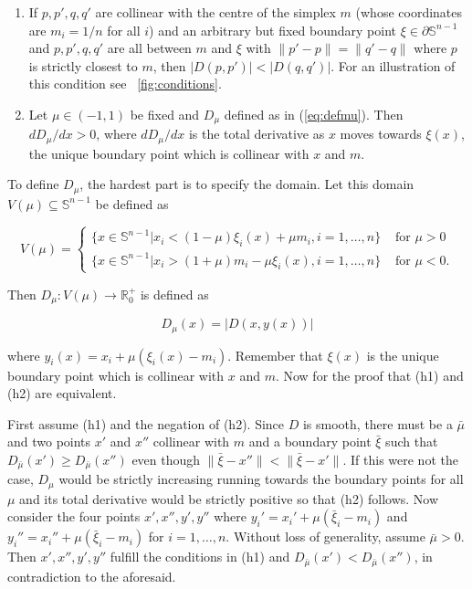 \documentclass[phd,12pt,oneside]{ubcthesis}
\begin{document}
\begin{enumerate}[(h1)]
\item If $p,p',q,q'$ are collinear with the centre of the
  simplex $m$ (whose coordinates are $m_{i}=1/n$ for all $i$) and an
  arbitrary but fixed boundary point $\xi\in\partial\mathbb{S}^{n-1}$
  and $p,p',q,q'$ are all between $m$ and $\xi$ with
  $\|p'-p\|=\|q'-q\|$ where $p$ is strictly closest to $m$, then
  $|D(p,p')|<|D(q,q')|$. For an illustration of this condition see
  {\igure}~\ref{fig:conditions}.
\item Let $\mu\in(-1,1)$ be fixed and $D_{\mu}$ defined as in
  (\ref{eq:defmu}). Then $dD_{\mu}/dx>0$, where $dD_{\mu}/dx$ is the
  total derivative as $x$ moves towards $\xi(x)$, the unique boundary
  point which is collinear with $x$ and $m$.
\end{enumerate}

To define $D_{\mu}$, the hardest part is to specify the domain. Let
this domain $V(\mu)\subseteq{}\mathbb{S}^{n-1}$ be defined as

\begin{equation}
  \label{eq:defvmu}
  V(\mu)=\left\{\begin{array}{ll}
    \{x\in\mathbb{S}^{n-1}|x_{i}<(1-\mu)\xi_{i}(x)+\mu{}m_{i},i=1,\ldots,n\}&\mbox{ for }\mu>0 \\
    \{x\in\mathbb{S}^{n-1}|x_{i}>(1+\mu)m_{i}-\mu{}\xi_{i}(x),i=1,\ldots,n\}&\mbox{ for }\mu<0.
  \end{array}\right.
\end{equation}

{\noindent}Then $D_{\mu}:V(\mu)\rightarrow{}\mathbb{R}^{+}_{0}$ is defined as

\begin{equation}
  \label{eq:defmu}
  D_{\mu}(x)=|D(x,y(x))|
\end{equation}

{\noindent}where $y_{i}(x)=x_{i}+\mu(\xi_{i}(x)-m_{i})$. Remember that $\xi(x)$
is the unique boundary point which is collinear with $x$ and $m$.
Now for the proof that (h1) and (h2) are equivalent. 

First assume (h1) and the negation of (h2). Since $D$ is smooth, there
must be a $\bar{\mu}$ and two points $x'$ and $x''$ collinear with $m$
and a boundary point $\bar{\xi}$ such that
$D_{\bar{\mu}}(x')\geq{}D_{\bar{\mu}}(x'')$ even though
$\|\bar{\xi}-x''\|<\|\bar{\xi}-x'\|$. If this were not the case,
$D_{\mu}$ would be strictly increasing running towards the boundary
points for all $\mu$ and its total derivative would be strictly
positive so that (h2) follows. Now consider the four points
$x',x'',y',y''$ where $y_{i}'=x_{i}'+\mu(\bar{\xi}_{i}-m_{i})$ and
$y_{i}''=x_{i}''+\mu(\bar{\xi}_{i}-m_{i})$ for $i=1,\ldots,n$. Without
loss of generality, assume $\bar{\mu}>0$. Then $x',x'',y',y''$ fulfill
the conditions in (h1) and $D_{\bar{\mu}}(x')<{}D_{\bar{\mu}}(x'')$,
in contradiction to the aforesaid.
\end{document}
